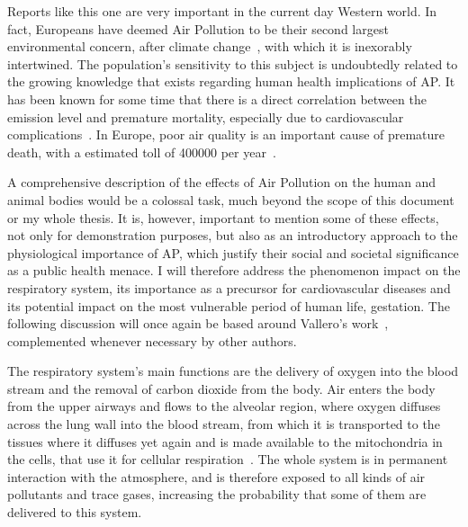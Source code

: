Reports like this one are very important in the current day Western
world. In fact, Europeans have deemed Air Pollution to be their second
largest environmental concern, after climate
change~\cite{TheEuropeanUnion2017}, with which it is inexorably
intertwined. The population's sensitivity to this subject is undoubtedly
related to the growing knowledge that exists regarding human health
implications of \gls{AP}. It has been known for some time that there is
a direct correlation between the emission level and premature mortality,
especially due to cardiovascular complications~\cite{Ghorani-Azam2016,
Carugno2016, Kampa2008, Kollanus2016}. In Europe, poor air quality is
an important cause of premature death, with a estimated toll of 400000
per year~\cite{EEA2016}.

A comprehensive description of the effects of Air Pollution on the human
and animal bodies would be a colossal task, much beyond the scope of
this document or my whole thesis. It is, however, important to mention
some of these effects, not only for demonstration purposes, but also as
an introductory approach to the physiological importance of \gls{AP},
which justify their social and societal significance as a public health
menace. I will therefore address the phenomenon impact on the
respiratory system, its importance as a precursor for cardiovascular
diseases and its potential impact on the most vulnerable period of human
life, gestation. The following discussion will once again be based
around Vallero's work~\cite{Vallero2014}, complemented whenever
necessary by other authors. 

The respiratory system's main functions are the delivery of oxygen into
the blood stream and the removal of carbon dioxide from the body. Air
enters the body from the upper airways and flows to the alveolar region,
where oxygen diffuses across the lung wall into the blood stream, from
which it is transported to the tissues where it diffuses yet again and
is made available to the mitochondria in the cells, that use it for
cellular respiration~\cite{Nilsson2010}. The whole system
is in permanent interaction with the atmosphere, and is therefore
exposed to all kinds of air pollutants and trace gases, increasing the
probability that some of them are delivered to this system. 

